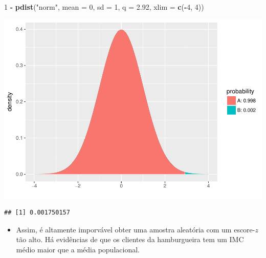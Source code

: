 \documentclass[]{article}
\newenvironment{Shaded}{\begin{snugshade}}{\end{snugshade}}
\newcommand{\KeywordTok}[1]{\textcolor[rgb]{0.13,0.29,0.53}{\textbf{#1}}}
\newcommand{\DataTypeTok}[1]{\textcolor[rgb]{0.13,0.29,0.53}{#1}}
\newcommand{\DecValTok}[1]{\textcolor[rgb]{0.00,0.00,0.81}{#1}}
\newcommand{\FloatTok}[1]{\textcolor[rgb]{0.00,0.00,0.81}{#1}}
\newcommand{\StringTok}[1]{\textcolor[rgb]{0.31,0.60,0.02}{#1}}
\newcommand{\OperatorTok}[1]{\textcolor[rgb]{0.81,0.36,0.00}{\textbf{#1}}}
\newcommand{\NormalTok}[1]{#1}
\providecommand{\tightlist}{%
  \setlength{\itemsep}{0pt}\setlength{\parskip}{0pt}}
\begin{document}
\begin{Shaded}
\begin{Highlighting}[]
\DecValTok{1} \OperatorTok{-}\StringTok{ }\KeywordTok{pdist}\NormalTok{(}\StringTok{"norm"}\NormalTok{, }\DataTypeTok{mean =} \DecValTok{0}\NormalTok{, }\DataTypeTok{sd =} \DecValTok{1}\NormalTok{, }\DataTypeTok{q =} \FloatTok{2.92}\NormalTok{, }\DataTypeTok{xlim =} \KeywordTok{c}\NormalTok{(}\OperatorTok{-}\DecValTok{4}\NormalTok{, }\DecValTok{4}\NormalTok{))}
\end{Highlighting}
\end{Shaded}

\includegraphics{probability_files/figure-latex/unnamed-chunk-14-1.pdf}

\begin{verbatim}
## [1] 0.001750157
\end{verbatim}

\begin{itemize}
\tightlist
\item
  Assim, é altamente imporvável obter uma amostra aleatória com um
  escore-\(z\) tão alto. Há evidências de que os clientes da
  hamburgueira tem um IMC médio maior que a média populacional.
\end{itemize}
\end{document}
